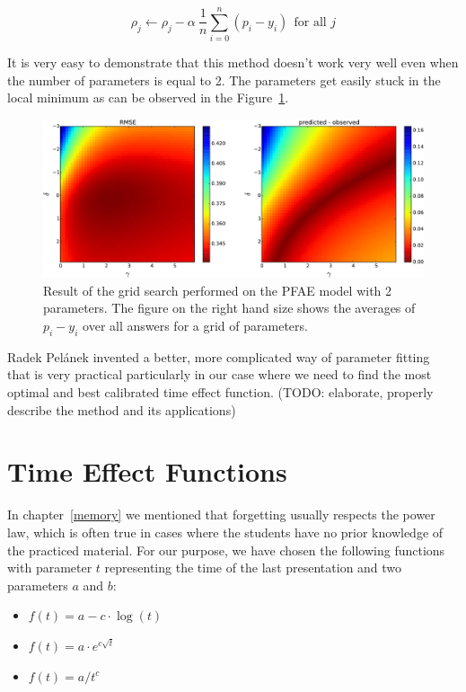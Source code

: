 \begin{equation} \label{online-learning-batch-rule}
 \rho_j \gets \rho_j - \alpha~\frac{1}{n}\sum_{i=0}^n (p_i - y_i)~~\text{for all } j
\end{equation}

It is very easy to demonstrate that this method doesn't work very well even when the number of parameters is equal to 2. The parameters get easily stuck in the local minimum as can be observed in the Figure~\ref{fig-grid-search-rmse-off}.

\begin{figure}[htbp]
  \centering
  \includegraphics[width=\textwidth]{img/pfa-grid-search-rmse-off}
  \caption{Result of the grid search performed on the PFAE model with 2 parameters. The figure on the right hand size shows the averages of $p_i - y_i$ over all answers for a grid of parameters.}
  \label{fig-grid-search-rmse-off}
\end{figure}

Radek Pelánek invented a better, more complicated way of parameter fitting~\cite{Pelanek2015} that is very practical particularly in our case where we need to find the most optimal and best calibrated time effect function. (TODO: elaborate, properly describe the method and its applications)

\section{Time Effect Functions}
\label{time-effect-functions}

In chapter~\ref{memory} we mentioned that forgetting usually respects the power law, which is often true in cases where the students have no prior knowledge of the practiced material. For our purpose, we have chosen the following functions with parameter $t$ representing the time of the last presentation and two parameters $a$ and $b$:

\begin{itemize}
  \item $f(t) = a - c \cdot \log(t)$
  \item $f(t) = a \cdot e^{c \sqrt{t}}$
  \item $f(t) = a / t^c$
\end{itemize}

